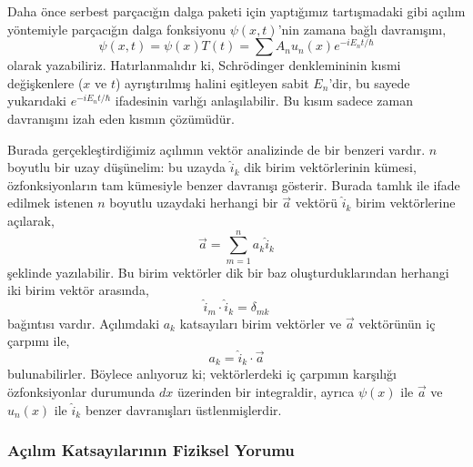 \documentclass[00_kitap.tex]{subfiles}
\begin{document}
Daha önce serbest parçacığın dalga paketi için yaptığımız tartışmadaki gibi açılım yöntemiyle parçacığın dalga fonksiyonu $\psi(x,t)$'nin zamana bağlı davranışını,
\begin{equation}
\psi ( x , t ) = \psi ( x ) T(t) = \sum A _ { n } u _ { n } ( x ) e ^ { - i E _ { n } t / \hbar }
\end{equation}
olarak yazabiliriz. Hatırlanmalıdır ki, Schrödinger denklemininin kısmi değişkenlere ($x$ ve $t$) ayrıştırılmış halini eşitleyen sabit $E_n$'dir, bu sayede yukarıdaki $e ^ { - i E _ { n } t / \hbar }$ ifadesinin varlığı anlaşılabilir. Bu kısım sadece zaman davranışını izah eden kısmın çözümüdür.

Burada gerçekleştirdiğimiz açılımın vektör analizinde de bir benzeri vardır. $n$ boyutlu bir uzay düşünelim: bu uzayda $\hat i_k$ dik birim vektörlerinin kümesi, özfonksiyonların tam kümesiyle benzer davranışı gösterir. Burada tamlık ile ifade edilmek istenen $n$ boyutlu uzaydaki herhangi bir $\vec a$ vektörü $\hat i_k$ birim vektörlerine açılarak,
\begin{equation}
\vec a = \sum _ { m = 1 } ^ { n } a _ { k } \hat i _ { k }
\end{equation}
şeklinde yazılabilir. Bu birim vektörler dik bir baz oluşturduklarından herhangi iki birim vektör arasında,
\begin{equation}
\hat i  _ { m } \cdot \hat { i } _ { k } = \delta _ { m k }
\end{equation}
bağıntısı vardır. Açılımdaki $a_k$ katsayıları birim vektörler ve $\vec a$ vektörünün iç çarpımı ile,
\begin{equation}
a _ { k } = \hat i _ { k } \cdot \vec a
\end{equation}
bulunabilirler. Böylece anlıyoruz ki; vektörlerdeki iç çarpımın karşılığı özfonksiyonlar durumunda $dx$ üzerinden bir integraldir, ayrıca  $\psi(x)$ ile $\vec a$ ve $u_n(x)$ ile $\hat i_k$ benzer davranışları üstlenmişlerdir.

\subsubsection{Açılım Katsayılarının Fiziksel Yorumu}
\end{document}

